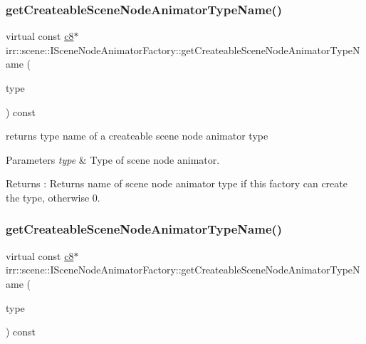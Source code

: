 \subsubsection{\texorpdfstring{get\+Createable\+Scene\+Node\+Animator\+Type\+Name()}{getCreateableSceneNodeAnimatorTypeName()}\hspace{0.1cm}{\footnotesize\ttfamily [3/4]}}
{\footnotesize\ttfamily virtual const \hyperlink{namespaceirr_a9395eaea339bcb546b319e9c96bf7410}{c8}$\ast$ irr\+::scene\+::\+I\+Scene\+Node\+Animator\+Factory\+::get\+Createable\+Scene\+Node\+Animator\+Type\+Name (\begin{DoxyParamCaption}\item[{\hyperlink{namespaceirr_1_1scene_a327a1e43872705cf8f3f3342fb307d19}{E\+S\+C\+E\+N\+E\+\_\+\+N\+O\+D\+E\+\_\+\+A\+N\+I\+M\+A\+T\+O\+R\+\_\+\+T\+Y\+PE}}]{type }\end{DoxyParamCaption}) const\hspace{0.3cm}{\ttfamily [pure virtual]}}



returns type name of a createable scene node animator type 


\begin{DoxyParams}{Parameters}
{\em type} & Type of scene node animator. \\
\hline
\end{DoxyParams}
\begin{DoxyReturn}{Returns}
\+: Returns name of scene node animator type if this factory can create the type, otherwise 0. 
\end{DoxyReturn}
\mbox{\label{classirr_1_1scene_1_1ISceneNodeAnimatorFactory_a905e896d9fbb0821dd4bf4214b786116}} 
\subsubsection{\texorpdfstring{get\+Createable\+Scene\+Node\+Animator\+Type\+Name()}{getCreateableSceneNodeAnimatorTypeName()}\hspace{0.1cm}{\footnotesize\ttfamily [4/4]}}
{\footnotesize\ttfamily virtual const \hyperlink{namespaceirr_a9395eaea339bcb546b319e9c96bf7410}{c8}$\ast$ irr\+::scene\+::\+I\+Scene\+Node\+Animator\+Factory\+::get\+Createable\+Scene\+Node\+Animator\+Type\+Name (\begin{DoxyParamCaption}\item[{\hyperlink{namespaceirr_1_1scene_a327a1e43872705cf8f3f3342fb307d19}{E\+S\+C\+E\+N\+E\+\_\+\+N\+O\+D\+E\+\_\+\+A\+N\+I\+M\+A\+T\+O\+R\+\_\+\+T\+Y\+PE}}]{type }\end{DoxyParamCaption}) const\hspace{0.3cm}{\ttfamily [pure virtual]}}



